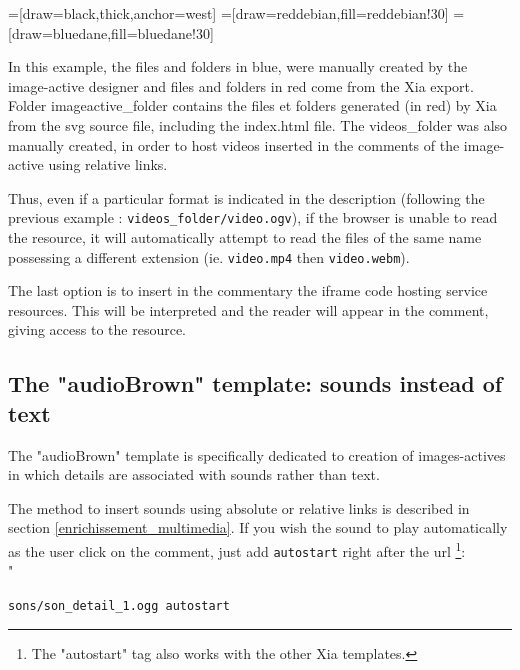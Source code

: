 =[draw=black,thick,anchor=west]
=[draw=reddebian,fill=reddebian!30]
=[draw=bluedane,fill=bluedane!30]

In this example, the files and folders in blue, were manually 
created by the image-active designer and files and folders in red come from the Xia export.
Folder \textcolor{bluedane}
{imageactive\_folder} contains the files et folders generated (in red) by Xia from the 
svg source file, including the \textcolor{reddebian}{index.html} file. The \textcolor{bluedane}
{videos\_folder} was also manually created, in order to host videos inserted 
in the comments of the image-active using relative links.


Thus, even if a particular format is indicated in the description (following 
the previous example : \verb|videos_folder/video.ogv|), if the browser is 
unable to read the resource, it will automatically attempt to read the files 
of the same name possessing a different extension (ie. \verb|video.mp4| 
then \verb|video.webm|).

The last option is to insert in the commentary the iframe code hosting service 
resources. This will be interpreted and the reader will appear in the comment, 
giving access to the resource.

\subsection{The "audioBrown" template: sounds instead of text}

The "audioBrown" template is specifically dedicated to creation of 
images-actives in which details are associated with sounds rather than text.

The method to insert sounds using absolute or relative links is described in 
section 
\ref{enrichissement_multimedia}. If you wish the sound to play 
automatically as the user click on the comment, just add \verb|autostart| right 
after the url \footnote{The "autostart" tag also works with the other 
Xia templates.}:\\"
\begin{center}
 \verb|sons/son_detail_1.ogg autostart|
\end{center}


